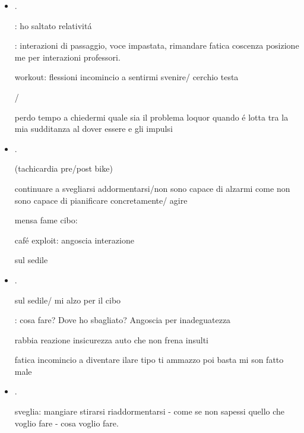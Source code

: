 \begin{itemize}
\item {}.

: ho saltato relativit\'a

: interazioni di passaggio, voce impastata,  rimandare fatica coscenza posizione me per interazioni professori.


workout: flessioni incomincio a sentirmi svenire/ cerchio testa

/

perdo tempo a chiedermi quale sia il problema loquor quando \'e lotta tra la mia sudditanza al dover essere e gli impulsi

\item {}.

(tachicardia pre/post bike)

continuare a svegliarsi addormentarsi/non sono capace di alzarmi come non sono capace di pianificare concretamente/ agire

mensa fame cibo: 


caf\'e exploit: angoscia interazione 

sul sedile

\item {}.

sul sedile/ mi alzo per il cibo

: cosa fare? Dove ho sbagliato? Angoscia per inadeguatezza

rabbia reazione insicurezza auto che non frena insulti

fatica incomincio a diventare ilare tipo ti ammazzo poi basta mi son fatto male

\item {}.

sveglia: mangiare stirarsi riaddormentarsi - come se non sapessi quello che voglio fare - cosa voglio fare.



\end{itemize}
